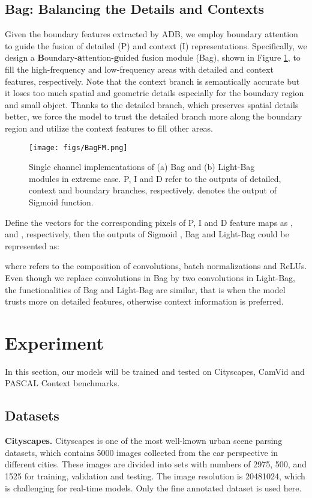 \documentclass[10pt,twocolumn,letterpaper]{article}
\begin{document}
\subsection{Bag: Balancing the Details and Contexts} 
Given the boundary features extracted by ADB, we employ boundary attention to guide the fusion of detailed (P) and context (I) representations. Specifically, we design a \textbf{B}oundary-\textbf{a}ttention-\textbf{g}uided fusion module (Bag), shown in Figure \ref{fig:bag}, to fill the high-frequency and low-frequency areas with detailed and context features, respectively. Note that the context branch is semantically accurate but it loses too much spatial and geometric details especially for the boundary region and small object. Thanks to the detailed branch, which preserves spatial details better, we force the model to trust the detailed branch more along the boundary region and utilize the context features to fill other areas.
\begin{figure}[ht]
\centering
    \texttt{[image: figs/BagFM.png]}
\caption{Single channel implementations of (a) Bag and (b) Light-Bag modules in extreme case. P, I and D refer to the outputs of detailed, context and boundary branches, respectively.  denotes the output of Sigmoid function.}
\label{fig:bag}
\end{figure}
Define the vectors for the corresponding pixels of P, I and D feature maps as ,  and , respectively, then the outputs of Sigmoid , Bag and Light-Bag could be represented as: 



where  refers to the composition of convolutions, batch normalizations and ReLUs. Even though we replace  convolutions in Bag by two  convolutions in Light-Bag, the functionalities of Bag and Light-Bag are similar, that is when  the model trusts more on detailed features, otherwise context information is preferred.


\section{Experiment}
\label{sec:exp}
In this section, our models will be trained and tested on Cityscapes, CamVid and PASCAL Context benchmarks. 

\subsection{Datasets}
\noindent
\textbf{Cityscapes.} Cityscapes \cite{cityscapes} is one of the most well-known urban scene parsing datasets, which contains 5000 images collected from the car perspective in different cities. These images are divided into sets with numbers of 2975, 500, and 1525 for training, validation and testing. The image resolution is 20481024, which is challenging for real-time models. Only the fine annotated dataset is used here.
\end{document}
